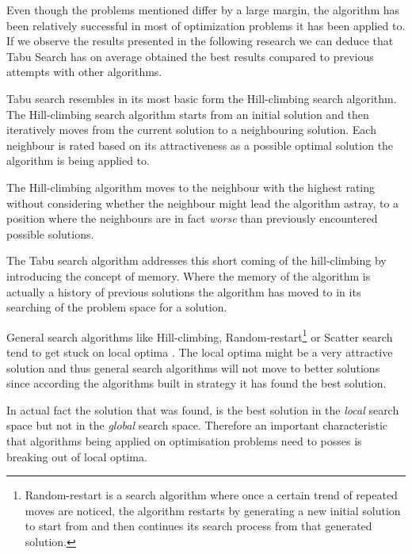 Even though the problems mentioned differ by a large margin, the algorithm has been relatively successful in most of optimization problems it has been applied to. If we observe the results presented in the following research \cite{TabuCarryOver,TabuSingleMachineScheduling,TabuVechicleRoutingWithTimeWindows,TabuBiddingStrats,TabuCrewSchedulingProblem,ReactiveTabuVHR,TabuRCAProblem,TabuCSP,TabuMontemanniSmith,tabuglobalplanning3g} we can deduce that Tabu Search has on average obtained the best results compared to previous attempts with other algorithms. 

Tabu search resembles in its most basic form the Hill-climbing search algorithm\cite{TabuBiddingStrats}. The Hill-climbing search algorithm starts from an initial solution and then iteratively moves from the current solution to a neighbouring solution\cite{AIModernApproach}. Each neighbour is rated based on its attractiveness as a possible optimal solution the algorithm is being applied to\cite{AIModernApproach}. 

The Hill-climbing algorithm moves to the neighbour with the highest rating without considering whether the neighbour might lead the algorithm astray, to a position where the neighbours are in fact \emph{worse} than previously encountered possible solutions\cite{AIModernApproach}. 

The Tabu search algorithm addresses this short coming of the hill-climbing by introducing the concept of memory\cite{TabuBiddingStrats}. Where the memory of the algorithm is actually a history of previous solutions the algorithm has moved to in its searching of the problem space for a solution\cite{TabuBiddingStrats}. 

General search algorithms like Hill-climbing, Random-restart\footnote{Random-restart is a search algorithm where once a certain trend of repeated moves are noticed, the algorithm restarts by generating a new initial solution to start from and then continues its search process from that generated solution\cite{AIModernApproach}.} or Scatter search tend to get stuck on local optima \cite{AIModernApproach}. The local optima might be a very attractive solution and thus general search algorithms will not move to better solutions since according the algorithms built in strategy it has found the best solution. 

In actual fact the solution that was found, is the best solution in the \emph{local} search space but not in the \emph{global} search space\cite{CompuIntelligenceIntro,AIModernApproach}. Therefore an important characteristic that algorithms being applied on optimisation problems need to posses is breaking out of local optima\cite{CompuIntelligenceIntro,AIModernApproach}.

